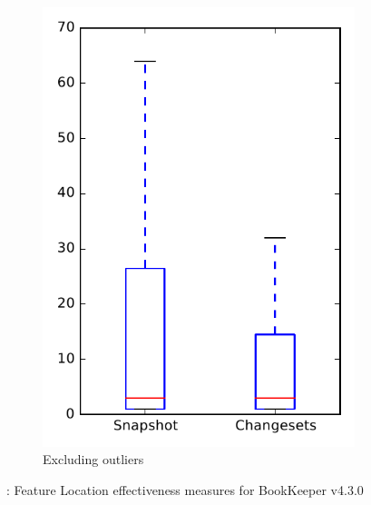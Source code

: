 \begin{figure}
\begin{subfigure}{.4\textwidth}
        \includegraphics[height=0.4\textheight]{figures/flt/rq1_bookkeeper_no_outlier}
        \caption{Excluding outliers}\label{fig:flt:rq1:bookkeeper_no_outlier}
    \end{subfigure}
\caption{\fone: Feature Location effectiveness measures for BookKeeper v4.3.0}
\label{fig:flt:rq1:bookkeeper}
\end{figure}

